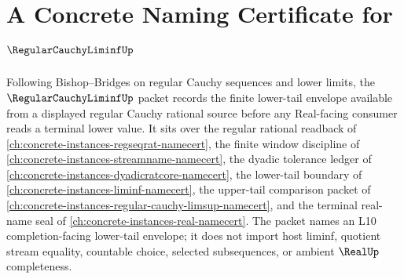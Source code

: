 \chapter{A Concrete Naming Certificate for $\RegularCauchyLiminfUp$}
\label{ch:concrete-instances-regular-cauchy-liminf-namecert}

Following Bishop--Bridges on regular Cauchy sequences and lower limits, the $\RegularCauchyLiminfUp$ packet records the finite lower-tail envelope available from a displayed regular Cauchy rational source before any Real-facing consumer reads a terminal lower value. It sits over the regular rational readback of \autoref{ch:concrete-instances-regseqrat-namecert}, the finite window discipline of \autoref{ch:concrete-instances-streamname-namecert}, the dyadic tolerance ledger of \autoref{ch:concrete-instances-dyadicratcore-namecert}, the lower-tail boundary of \autoref{ch:concrete-instances-liminf-namecert}, the upper-tail comparison packet of \autoref{ch:concrete-instances-regular-cauchy-limsup-namecert}, and the terminal real-name seal of \autoref{ch:concrete-instances-real-namecert}. The packet names an L10 completion-facing lower-tail envelope; it does not import host liminf, quotient stream equality, countable choice, selected subsequences, or ambient $\RealUp$ completeness.

